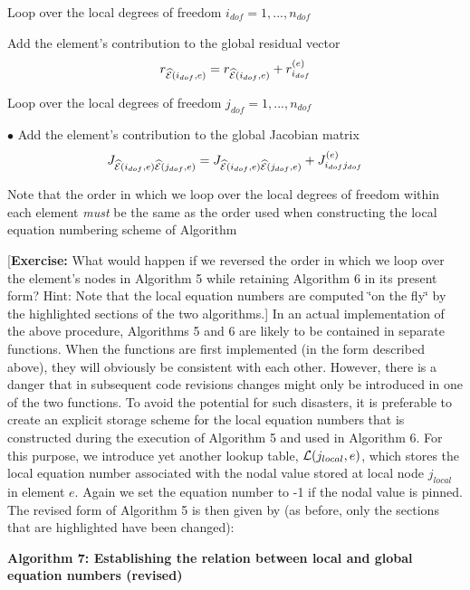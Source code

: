 \begin{DoxyItemize}
\begin{DoxyItemize}
\item Loop over the local degrees of freedom $ i_{dof}=1,...,n_{dof} $
\begin{DoxyItemize}
\item Add the element's contribution to the global residual vector \[ r_{\widehat{\cal E}(i_{dof},e)} = r_{\widehat{\cal E}(i_{dof},e)} + r_{i_{dof}}^{(e)} \]
\begin{DoxyItemize}
\item Loop over the local degrees of freedom $ j_{dof}=1,...,n_{dof}$ \par
\par
 $ \bullet $ Add the element's contribution to the global Jacobian matrix \[ J_{\widehat{\cal E}(i_{dof},e)\widehat{\cal E}(j_{dof},e) } = J_{\widehat{\cal E}(i_{dof},e)\widehat{\cal E}(j_{dof},e) } + J_{i_{dof} j_{dof}}^{(e)} \]
\end{DoxyItemize}
\end{DoxyItemize}
\end{DoxyItemize}
\end{DoxyItemize}Note that the order in which we loop over the local degrees of freedom within each element {\itshape must} be the same as the order used when constructing the local equation numbering scheme of Algorithm
\begin{DoxyEnumerate}
\item \mbox{[}{\bfseries Exercise\-:} What would happen if we reversed the order in which we loop over the element's nodes in Algorithm 5 while retaining Algorithm 6 in its present form? Hint\-: Note that the local equation numbers are computed \char`\"{}on the fly\char`\"{} by the highlighted sections of the two algorithms.\mbox{]} In an actual implementation of the above procedure, Algorithms 5 and 6 are likely to be contained in separate functions. When the functions are first implemented (in the form described above), they will obviously be consistent with each other. However, there is a danger that in subsequent code revisions changes might only be introduced in one of the two functions. To avoid the potential for such disasters, it is preferable to create an explicit storage scheme for the local equation numbers that is constructed during the execution of Algorithm 5 and used in Algorithm 6. For this purpose, we introduce yet another lookup table, $ {\cal L}(j_{local},e)$, which stores the local equation number associated with the nodal value stored at local node $ j_{local}$ in element $e$. Again we set the equation number to -\/1 if the nodal value is pinned. The revised form of Algorithm 5 is then given by (as before, only the sections that are highlighted have been changed)\-:

\begin{center} {\bfseries  Algorithm 7\-: Establishing the relation between local and global equation numbers (revised) } \end{center} 
\end{DoxyEnumerate}


